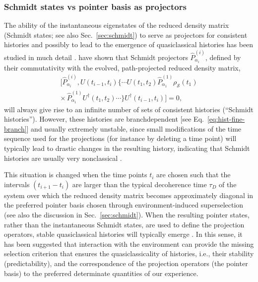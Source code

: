 \documentclass[rmp,aps,amsmath,amsfonts,noshowkeys,noshowpacs,12pt]{revtex4}
\begin{document}
\subsubsection{Schmidt states vs pointer basis as projectors}

The ability of the instantaneous eigenstates of the reduced density
matrix (Schmidt states; see also Sec.~\ref{sec:schmidt}) to serve as
projectors for consistent histories and possibly to lead to the
emergence of quasiclassical histories has been studied in much detail
\citep{Albrecht:1992:rz,Albrecht:1993:pq,Zurek:1993:pu,Paz:1993:ww,Kent:1997:oz}.
\citet{Paz:1993:ww} have shown that Schmidt projectors
$\widehat{P}^{(i)}_{\alpha_i}$, defined by their commutativity with
the evolved, path-projected reduced density matrix, 
%
\begin{multline} 
\big[\widehat{P}^{(i)}_{\alpha_i}, U(t_{i-1},t_i) \{ \cdots
U(t_1,t_2) \widehat{P}^{(1)}_{\alpha_1} \rho_\mathcal{S}(t_1)
\\ \times \, \widehat{P}^{(1)}_{\alpha_1} U^\dagger(t_1,t_2) \cdots \}
U^\dagger(t_{i-1},t_i)\big] = 0, 
\end{multline}
%
will always give rise to an infinite number of sets of consistent
histories (``Schmidt histories''). However, these histories are
branchdependent [see Eq.~\eqref{eq:hist-fine-branch}] and usually
extremely unstable, since small modifications of the time sequence
used for the projections (for instance by deleting a time point) will
typically lead to drastic changes in the resulting history, indicating
that Schmidt histories are usually very nonclassical
\citep{Zurek:1993:pu,Paz:1993:ww}.

This situation is changed when the time points $t_i$ are chosen such
that the intervals $(t_{i+1}-t_i)$ are larger than the typical
decoherence time $\tau_D$ of the system over which the reduced density
matrix becomes approximately diagonal in the preferred pointer basis
chosen through environment-induced superselection (see also the
discussion in Sec.~\ref{sec:schmidt}). When the resulting pointer
states, rather than the instantaneous Schmidt states, are used to
define the projection operators, stable quasiclassical histories will
typically emerge \citep{Zurek:1993:pu,Paz:1993:ww}.  In this sense, it
has been suggested that interaction with the environment can
provide the missing selection criterion that ensures the
quasiclassicality of histories, i.e., their stability (predictability),
and the correspondence of the projection operators (the pointer basis)
to the preferred determinate quantities of our experience.
\end{document}
